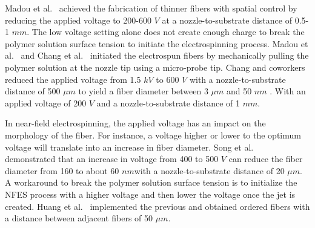 Madou et al.\unskip~\cite{527120:11973130} achieved the fabrication of thinner fibers with spatial control by reducing the applied voltage to 200-600 $V $  at a nozzle-to-substrate distance of 0.5-1 $mm $. The low voltage setting alone does not create enough charge to break the polymer solution surface tension to initiate the electrospinning process. Madou et al.\unskip~\cite{527120:11973130} and Chang et al.\unskip~\cite{527120:11974306} initiated the electrospun fibers by mechanically pulling the polymer solution at the nozzle tip using a micro-probe tip. Chang and coworkers reduced the applied voltage from 1.5 $kV $ to 600 $V $ with a nozzle-to-substrate distance of 500 $\mu m $ to yield a fiber diameter between 3 $\mu m $  and 50 $nm $ . With an applied voltage of 200 $V $ and a nozzle-to-substrate distance of 1 $mm $.

In near-field electrospinning, the applied voltage has an impact on the morphology of the fiber. For instance, a voltage higher or lower to the optimum voltage will translate into an increase in fiber diameter. Song et al.\unskip~\cite{527120:11974320} demonstrated that an increase in voltage from 400 to 500 $V $ can reduce the fiber diameter from 160 to about 60 $nm $with a nozzle-to-substrate distance of 20 $\mu m $. A workaround to break the polymer solution surface tension is to initialize the NFES process with a higher voltage and then lower the voltage once the jet is created. Huang et al.\unskip~\cite{527120:11974311} implemented the previous and obtained ordered fibers with a distance between adjacent fibers of 50 $\mu m $.

